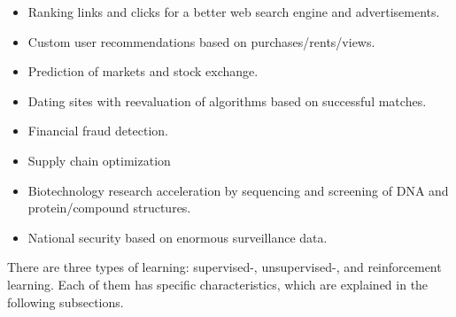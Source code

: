 \begin{itemize}
    \item Ranking links and clicks for a better web search engine and advertisements.
    \item Custom user recommendations based on purchases/rents/views.
    \item Prediction of markets and stock exchange.
    \item Dating sites with reevaluation of algorithms based on successful matches.
    \item Financial fraud detection.
    \item Supply chain optimization
    \item Biotechnology research acceleration by sequencing and screening of DNA and protein/compound structures.
    \item National security based on enormous surveillance data.
\end{itemize}

There are three types of learning: supervised-, unsupervised-, and reinforcement learning. Each of them  has specific characteristics, which are explained in the following subsections.
